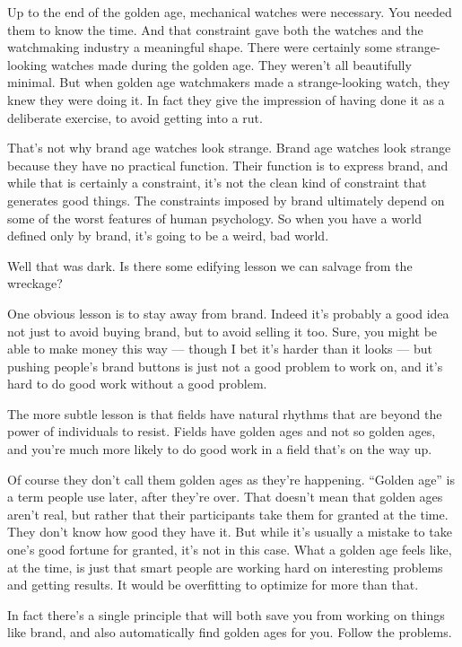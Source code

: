 \documentclass[12pt]{book}
\begin{document}
Up to the end of the golden age, mechanical watches were necessary. You
needed them to know the time. And that constraint gave both the watches
and the watchmaking industry a meaningful shape. There were certainly
some strange-looking watches made during the golden age. They weren't
all beautifully minimal. But when golden age watchmakers made a
strange-looking watch, they knew they were doing it. In fact they give
the impression of having done it as a deliberate exercise, to avoid
getting into a rut.

That's not why brand age watches look strange. Brand age watches look
strange because they have no practical function. Their function is to
express brand, and while that is certainly a constraint, it's not the
clean kind of constraint that generates good things. The constraints
imposed by brand ultimately depend on some of the worst features of
human psychology. So when you have a world defined only by brand, it's
going to be a weird, bad world.

Well that was dark. Is there some edifying lesson we can salvage from
the wreckage?

One obvious lesson is to stay away from brand. Indeed it's probably a
good idea not just to avoid buying brand, but to avoid selling it too.
Sure, you might be able to make money this way --- though I bet it's
harder than it looks --- but pushing people's brand buttons is just not
a good problem to work on, and it's hard to do good work without a good
problem.

The more subtle lesson is that fields have natural rhythms that are
beyond the power of individuals to resist. Fields have golden ages and
not so golden ages, and you're much more likely to do good work in a
field that's on the way up.

Of course they don't call them golden ages as they're happening.
``Golden age'' is a term people use later, after they're over. That
doesn't mean that golden ages aren't real, but rather that their
participants take them for granted at the time. They don't know how good
they have it. But while it's usually a mistake to take one's good
fortune for granted, it's not in this case. What a golden age feels
like, at the time, is just that smart people are working hard on
interesting problems and getting results. It would be overfitting to
optimize for more than that.

In fact there's a single principle that will both save you from working
on things like brand, and also automatically find golden ages for you.
Follow the problems.
\end{document}
